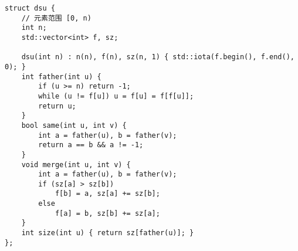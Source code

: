 \begin{lstlisting}
struct dsu {
	// 元素范围 [0, n)
	int n;
	std::vector<int> f, sz;
	
	dsu(int n) : n(n), f(n), sz(n, 1) { std::iota(f.begin(), f.end(), 0); }
	int father(int u) {
		if (u >= n) return -1;
		while (u != f[u]) u = f[u] = f[f[u]];
		return u;
	}
	bool same(int u, int v) {
		int a = father(u), b = father(v);
		return a == b && a != -1;
	}
	void merge(int u, int v) {
		int a = father(u), b = father(v);
		if (sz[a] > sz[b])
			f[b] = a, sz[a] += sz[b];
		else
			f[a] = b, sz[b] += sz[a];
	}
	int size(int u) { return sz[father(u)]; }
};
\end{lstlisting}
